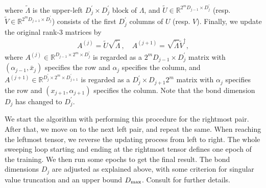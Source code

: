 {\begin{align}
\end{align}
where $\tilde{\Lambda}$ is the upper-left $D_j^\prime \times D_j^\prime$ block of $\Lambda$, and $\tilde{U}\in\mathbb{R}^{2^mD_{j-1} \times D_j^\prime}$ (resp. $\tilde{V}\in\mathbb{R}^{2^mD_{j+1} \times D_j^\prime}$) consists of the first $D_j^\prime$ columns of $U$ (resp. $V$).
Finally, we update the original rank-3 matrices by
\begin{align}
    A^{(j)}=\tilde{U}\sqrt{\tilde{\Lambda}}\, , \quad A^{(j+1)}=\sqrt{\tilde{\Lambda}}\tilde{V}^\dagger,
\end{align}
where $A^{(j)} \in \mathbb{R}^{D_{j-1} \times 2^m \times D_{j}^\prime}$ is regarded as a $2^mD_{j-1} \times D_j^\prime$ matrix with $(\alpha_{j-1},\bar x_{j})$ specifies the row and $\alpha_{j}$ specifies the column, and $A^{(j+1)} \in \mathbb{R}^{D_{j}^\prime \times 2^m \times D_{j+1}^\prime}$ is regarded as a $D_j^\prime \times D_{j+1}2^m$ matrix with $\alpha_{j}$ specifies the row and $(x_{j+1},\alpha_{j+1})$ specifies the column.
Note that the bond dimension $D_j$ has changed to $D_j^\prime$.

We start the algorithm with performing this procedure for the rightmost pair.
After that, we move on to the next left pair, and repeat the same. 
When reaching the leftmost tensor, we reverse the updating process from left to right.
The whole sweeping loop starting and ending at the rightmost tensor defines one epoch of the training.
We then run some epochs to get the final result.
The bond dimensions $D_j$ are adjusted as explained above, with some criterion for singular value truncation and an upper bound $D_{\rm max}$.
Consult \cite{han2018unsupervised} for further details.

}
